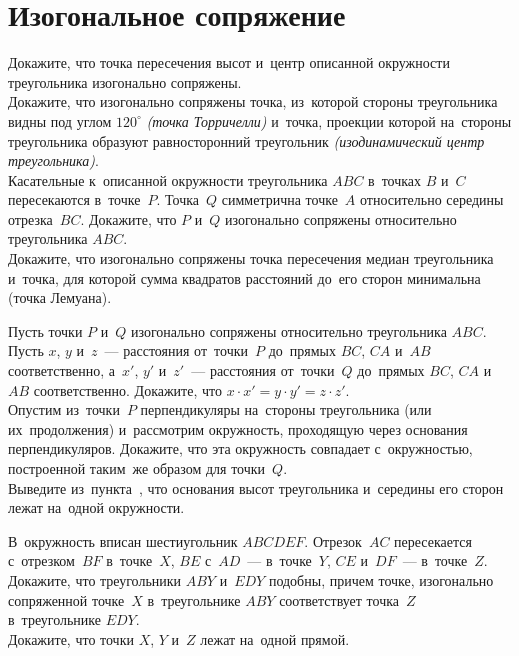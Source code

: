 
\section*{Изогональное сопряжение}


\begin{problems}

\item
\subproblem
Докажите, что точка пересечения высот и~центр описанной окружности треугольника
изогонально сопряжены.
\\
\subproblem
Докажите, что изогонально сопряжены точка, из~которой стороны треугольника
видны под углом $120^\circ$ \emph{(точка Торричелли)} и~точка, проекции которой
на~стороны треугольника образуют равносторонний треугольник
\emph{(изодинамический центр треугольника)}.
\\
\subproblem
Касательные к~описанной окружности треугольника $ABC$ в~точках $B$ и~$C$
пересекаются в~точке~$P$.
Точка~$Q$ симметрична точке~$A$ относительно середины отрезка~$BC$.
Докажите, что $P$ и~$Q$ изогонально сопряжены относительно треугольника $ABC$.
\\
\subproblem
Докажите, что изогонально сопряжены точка пересечения медиан треугольника
и~точка, для которой сумма квадратов расстояний до~его сторон минимальна
(точка Лемуана).

\item
\subproblem
Пусть точки $P$ и~$Q$ изогонально сопряжены относительно треугольника $ABC$.
Пусть $x$, $y$ и~$z$~--- расстояния от~точки~$P$ до~прямых $BC$, $CA$ и~$AB$
соответственно, а~$x'$, $y'$ и~$z'$~--- расстояния от~точки~$Q$
до~прямых $BC$, $CA$ и~$AB$ соответственно.
Докажите, что $x \cdot x' = y \cdot y' = z \cdot z'$.
\\
\subproblem
{}%
Опустим из~точки~$P$ перпендикуляры на~стороны треугольника
(или их~продолжения) и~рассмотрим окружность, проходящую через основания
перпендикуляров.
Докажите, что эта окружность совпадает с~окружностью, построенной таким~же
образом для точки~$Q$.
\\
\subproblem
Выведите
из~пункта~,
что основания высот треугольника и~середины его сторон лежат на~одной
окружности.

\item
\subproblem
В~окружность вписан шестиугольник $ABCDEF$.
Отрезок~$AC$ пересекается с~отрезком~$BF$ в~точке~$X$,
$BE$ с~$AD$~--- в~точке~$Y$,
$CE$ и~$DF$~--- в~точке~$Z$.
Докажите, что треугольники $ABY$ и~$EDY$ подобны, причем точке, изогонально
сопряженной точке~$X$ в~треугольнике $ABY$ соответствует точка~$Z$
в~треугольнике $EDY$.
\\
\subproblem
Докажите, что точки $X$, $Y$ и~$Z$ лежат на~одной прямой.


\end{problems}
